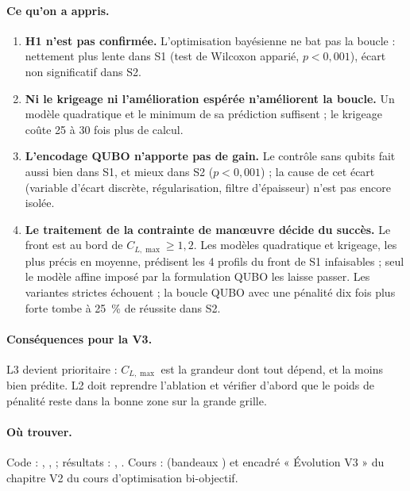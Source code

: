 \documentclass[11pt,a4paper]{report}
\begin{document}
\paragraph{Ce qu'on a appris.}
\begin{enumerate}
\item \textbf{H1 n'est pas confirmée.} L'optimisation bayésienne ne bat pas la boucle : nettement plus lente dans S1 (test de Wilcoxon apparié, $p<0{,}001$), écart non significatif dans S2.
\item \textbf{Ni le krigeage ni l'amélioration espérée n'améliorent la boucle.} Un modèle quadratique et le minimum de sa prédiction suffisent ; le krigeage coûte 25 à 30 fois plus de calcul.
\item \textbf{L'encodage QUBO n'apporte pas de gain.} Le contrôle sans qubits fait aussi bien dans S1, et mieux dans S2 ($p<0{,}001$) ; la cause de cet écart (variable d'écart discrète, régularisation, filtre d'épaisseur) n'est pas encore isolée.
\item \textbf{Le traitement de la contrainte de manœuvre décide du succès.} Le front est au bord de $C_{L,\max}\ge1{,}2$. Les modèles quadratique et krigeage, les plus précis en moyenne, prédisent les 4 profils du front de S1 infaisables ; seul le modèle affine imposé par la formulation QUBO les laisse passer. Les variantes strictes échouent ; la boucle QUBO avec une pénalité dix fois plus forte tombe à 25~\% de réussite dans S2.
\end{enumerate}

\paragraph{Conséquences pour la V3.} L3 devient prioritaire : $C_{L,\max}$ est la grandeur dont tout dépend, et la moins bien prédite. L2 doit reprendre l'ablation et vérifier d'abord que le poids de pénalité reste dans la bonne zone sur la grande grille.

\paragraph{Où trouver.} Code : , ,  ; résultats : , . Cours :  (bandeaux ) et encadré « Évolution V3 » du chapitre V2 du cours d'optimisation bi-objectif.
\end{document}
